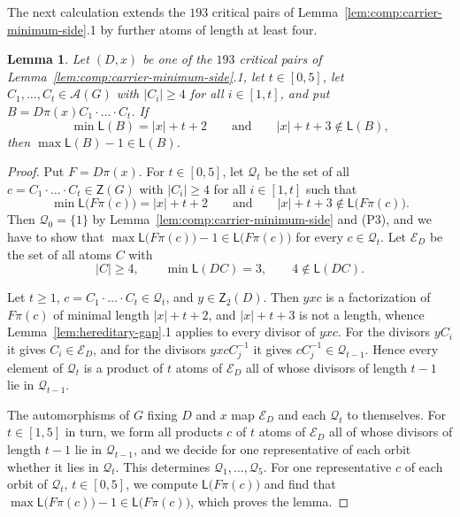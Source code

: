 \documentclass[a4paper, 10pt]{amsart}
\theoremstyle{plain}
\newtheorem{lemma}[theorem]{\bf Lemma}
\theoremstyle{definition}
\theoremstyle{definition}
\numberwithin{equation}{section}
\begin{document}
The next calculation extends the $193$ critical pairs
of Lemma~\ref{lem:comp:carrier-minimum-side}.1 by further atoms of length at
least four.

\begin{lemma} \label{lem:comp:bounded-endpoint}
Let $(D,x)$ be one of the $193$ critical pairs of
Lemma~\ref{lem:comp:carrier-minimum-side}.1, let $t \in [0,5]$, let
$C_1, \ldots, C_t \in \mathcal A (G)$ with $|C_i| \ge 4$ for all
$i \in [1,t]$, and put $B = D\pi(x)C_1 \cdot \ldots \cdot C_t$.  If
\[
 \min \mathsf L (B) = |x|+t+2
 \qquad \text{and} \qquad
 |x|+t+3 \notin \mathsf L (B) ,
\]
then $\max \mathsf L (B) - 1 \in \mathsf L (B)$.
\end{lemma}

\begin{proof}
Put $F = D\pi(x)$.  For $t \in [0,5]$, let $\mathcal Q_t$ be the set of all
$c = C_1 \cdot \ldots \cdot C_t \in \mathsf Z (G)$ with $|C_i| \ge 4$ for all
$i \in [1,t]$ such that
\[
 \min \mathsf L \big( F\pi(c) \big) = |x|+t+2
 \qquad \text{and} \qquad
 |x|+t+3 \notin \mathsf L \big( F\pi(c) \big) .
\]
Then $\mathcal Q_0 = \{1\}$ by Lemma~\ref{lem:comp:carrier-minimum-side} and
(P3), and we have to show that
$\max \mathsf L \big( F\pi(c) \big) - 1 \in \mathsf L \big( F\pi(c) \big)$ for every
$c \in \mathcal Q_t$.  Let $\mathcal E_D$ be the set of all atoms $C$ with
\[
 |C| \ge 4, \qquad \min\mathsf L(DC)=3, \qquad 4\notin\mathsf L(DC).
\]

Let $t \ge 1$, $c = C_1 \cdot \ldots \cdot C_t \in \mathcal Q_t$,
and $y \in \mathsf Z_2 (D)$.  Then $yxc$ is a factorization of $F\pi(c)$ of
minimal length $|x|+t+2$, and $|x|+t+3$ is not a length, whence
Lemma~\ref{lem:hereditary-gap}.1 applies to every divisor of $yxc$.  For the
divisors $yC_i$ it gives $C_i \in \mathcal E_D$, and for the divisors
$yxcC_j^{-1}$ it gives $cC_j^{-1} \in \mathcal Q_{t-1}$.  Hence every element
of $\mathcal Q_t$ is a product of $t$ atoms of $\mathcal E_D$ all of whose
divisors of length $t-1$ lie in $\mathcal Q_{t-1}$.

The automorphisms of $G$ fixing $D$ and $x$ map
$\mathcal E_D$ and each $\mathcal Q_t$ to themselves.  For $t \in [1,  5]$
in turn, we form all products $c$ of $t$ atoms of $\mathcal E_D$ all of whose
divisors of length $t-1$ lie in $\mathcal Q_{t-1}$, and we decide for one
representative of each orbit whether it lies in $\mathcal Q_t$.  This
determines $\mathcal Q_1, \ldots, \mathcal Q_5$.  For one representative $c$ of
each orbit of $\mathcal Q_t$, $t \in [0,5]$, we compute
$\mathsf L \big( F\pi(c) \big)$ and find that
$\max \mathsf L \big( F\pi(c) \big) - 1 \in \mathsf L \big( F\pi(c) \big)$, which proves the
lemma.


\end{proof}
\end{document}
